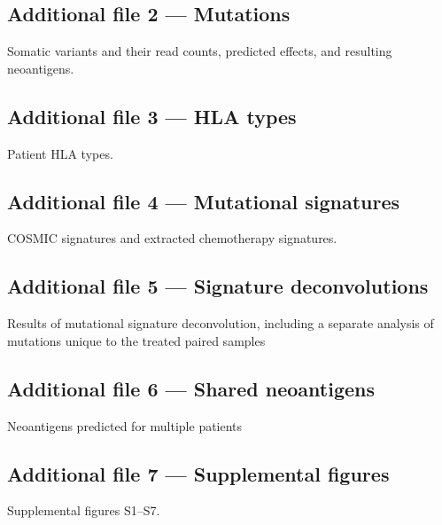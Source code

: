 \documentclass[linenumbers]{bmcart}
\begin{document}
\begin{backmatter}
  \subsection*{Additional file 2 --- Mutations}
    Somatic variants and their read counts, predicted effects, and resulting neoantigens.
  
  \subsection*{Additional file 3 --- HLA types}
    Patient HLA types.
    
  \subsection*{Additional file 4 --- Mutational signatures}
    COSMIC signatures and extracted chemotherapy signatures.
    
  \subsection*{Additional file 5 --- Signature deconvolutions}
    Results of mutational signature deconvolution, including a separate analysis of mutations unique to the treated paired samples
    
  \subsection*{Additional file 6 --- Shared neoantigens}
    Neoantigens predicted for multiple patients
    
  \subsection*{Additional file 7 --- Supplemental figures}
    Supplemental figures S1--S7.
    
\end{backmatter}
\end{document}
